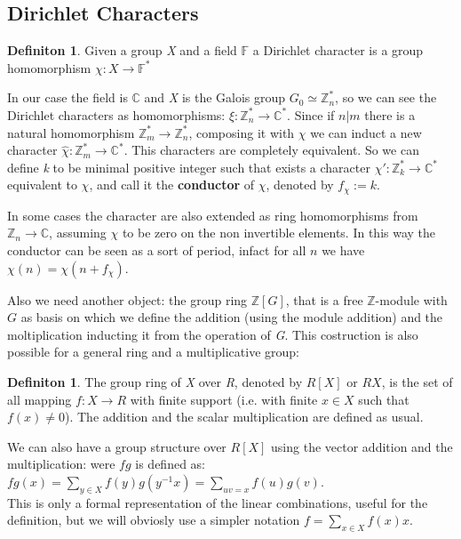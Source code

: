 \documentclass[]{article}
\theoremstyle{plain}
\theoremstyle{remark}
\theoremstyle{definition}
\newtheorem{deff}[teo]{Definiton}
\newcommand{\Z}{\mathbb{Z}}
\newcommand{\F}{\mathbb{F}}
\newcommand{\C}{\mathbb{C}}
\begin{document}
	\subsection{Dirichlet Characters}
	 
	 \begin{deff}
	 	Given a group \textit{X} and a field $ \F $ a Dirichlet character is a group homomorphism $ \chi :X \to \F ^*  $
	 \end{deff}
	 
	 In our case the field is $ \C $ and \textit{X} is the Galois group $ G_0 \simeq \Z_{n}^*$, so we can see the Dirichlet characters as homomorphisms: $ \xi :  \Z_{n}^* \to \C ^* $. Since if $ n | m $ there is a natural homomorphism $ \Z_m^* \to \Z_n^* $, composing it with $ \chi $ we can induct a new character $ \hat{\chi} :  \Z_m ^*  \to \C^\ast $. This characters are completely equivalent. So we can define \textit{k} to be minimal positive integer such that exists a character $ \chi' :  \Z_k ^*  \to \C^\ast $ equivalent to $\chi$, and call it the \textbf{conductor} of $\chi$, denoted by $ f_\chi := k $. 
	 
	 In some cases the character are also extended as ring homomorphisms from $ \Z_n \to \C $, assuming $ \chi $ to be zero on the non invertible elements. In this way the conductor can be seen as a sort of period, infact for all $ n $ we have $ \chi(n)=\chi(n+f_\chi) $. 
	 
	 Also we need another object: the group ring $ \Z[G] $, that is a free $ \Z $-module with $ G $ as basis on which we define the addition (using the module addition)  and the moltiplication inducting it from the operation of \textit{G}.
	 This costruction is also possible for a general ring and a multiplicative group:
	 
	 \begin{deff}
	 	The group ring of \textit{X} over \textit{R}, denoted by $ R[X] $ or $ RX $, is the set of all mapping $ f : X \to R $ with finite support (i.e. with finite $ x \in X $ such that $ f(x) \neq 0 $). The addition and the scalar multiplication are defined as usual. 
	 \end{deff}
 
 	We can also have a group structure over $ R[X] $ using the vector addition and the multiplication: were $ fg $ is defined as: $ fg(x) = \sum_{ y \in X } f(y)g(y^{-1}x) = \sum_{uv = x} f(u)g(v)$.\\
 	This is only a formal representation of the linear combinations, useful for the definition, but we will obviosly use a simpler notation $ f = \sum_{x \in X} f(x) x $.
 	
\end{document}
